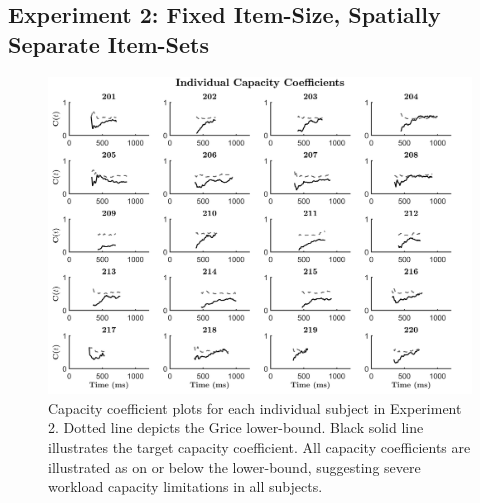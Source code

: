 \newpage
\subsection{Experiment 2: Fixed Item-Size, Spatially Separate Item-Sets}
\begin{figure}[htb]
\begin{center}
\includegraphics[width=\linewidth]{Figures/Appendix/FIG17JPG.jpg}
\caption{Capacity coefficient plots for each individual subject in Experiment 2. Dotted line depicts the Grice lower-bound. Black solid line illustrates the target capacity coefficient. All capacity coefficients are illustrated as on or below the lower-bound, suggesting severe workload capacity limitations in all subjects.}
\label{fig:Indiv_Cap_Ex2}
\end{center}
\end{figure}

\newpage
